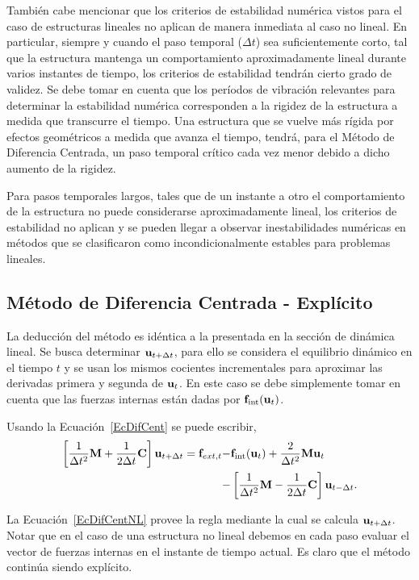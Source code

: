 También cabe mencionar que los criterios de estabilidad numérica vistos para el caso de estructuras lineales no aplican de manera inmediata al caso no lineal. En particular, siempre y cuando el paso temporal ($\Delta t$) sea suficientemente corto, tal que la estructura mantenga un comportamiento aproximadamente lineal durante varios instantes de tiempo, los criterios de estabilidad tendrán cierto grado de validez. Se debe tomar en cuenta que los períodos de vibración relevantes para determinar la estabilidad numérica corresponden a la rigidez de la estructura a medida que transcurre el tiempo. Una estructura que se vuelve más rígida por efectos geométricos a medida que avanza el tiempo, tendrá, para el Método de Diferencia Centrada, un paso temporal crítico cada vez menor debido a dicho aumento de la rigidez.

Para pasos temporales largos, tales que de un instante a otro el comportamiento de la estructura no puede considerarse aproximadamente lineal, los criterios de estabilidad no aplican y se pueden llegar a observar inestabilidades numéricas en métodos que se clasificaron como incondicionalmente estables para problemas lineales.

\subsection{Método de Diferencia Centrada - Explícito}

La deducción del método es idéntica a la presentada en la sección de dinámica lineal. Se busca determinar ${\bf u}_{t+\Delta t}$, para ello se considera el equilibrio dinámico en el tiempo $t$ y se usan los mismos cocientes incrementales para aproximar las derivadas primera y segunda de ${\bf u}_t$. En este caso se debe simplemente tomar en cuenta que las fuerzas internas están dadas por ${\bf f}_{\text{int}}({\bf u}_{t})$.

Usando la Ecuación~\eqref{EcDifCent} se puede escribir,
%
\begin{equation}\label{EcDifCentNL}
\begin{split}
\left[\frac{1}{\Delta t^2}{\bf M} + \frac{1}{2\Delta t}{\bf C} \right] {\bf u}_{t+\Delta t} = {\bf f}_{ext,t} - &{\bf f}_{\text{int}}({\bf u}_{t}) + \frac{2}{\Delta t ^2}{\bf M} {\bf u}_t \\
- & \left[\frac{1}{\Delta t^2}{\bf M}-\frac{1}{2\Delta t}{\bf C}\right] {\bf u}_{t-\Delta t}.
\end{split}
\end{equation}

La Ecuación~\eqref{EcDifCentNL} provee la regla mediante la cual se calcula ${\bf u}_{t+\Delta t}$. Notar que en el caso de una estructura no lineal debemos en cada paso evaluar el vector de fuerzas internas en el instante de tiempo actual. Es claro que el método continúa siendo explícito. 

